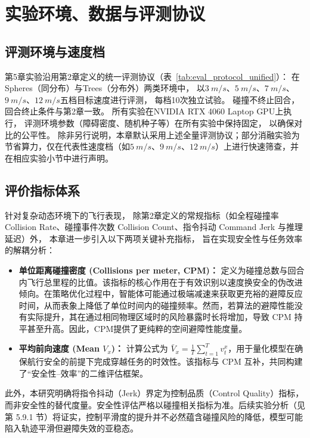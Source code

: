 \section{实验环境、数据与评测协议}

\subsection{评测环境与速度档}

第5章实验沿用第2章定义的统一评测协议（表~\ref{tab:eval_protocol_unified}）：
在Spheres（同分布）与Trees（分布外）两类环境中，
以$\SI{3}{m/s}$、$\SI{5}{m/s}$、$\SI{7}{m/s}$、$\SI{9}{m/s}$、$\SI{12}{m/s}$五档目标速度进行评测，
每档10次独立试验。
碰撞不终止回合，回合终止条件与第2章一致。
所有实验在NVIDIA RTX 4060 Laptop GPU上执行，
评测环境参数（障碍密度、随机种子等）在所有实验中保持固定，
以确保对比的公平性。
除非另行说明，本章默认采用上述全量评测协议；部分消融实验为节省算力，仅在代表性速度档（如$\SI{5}{m/s}$、$\SI{9}{m/s}$、$\SI{12}{m/s}$）上进行快速筛查，并在相应实验小节中进行声明。

\subsection{评价指标体系}

针对复杂动态环境下的飞行表现，
除第2章定义的常规指标（如全程碰撞率 Collision Rate、碰撞事件次数 Collision Count、指令抖动 Command Jerk 与推理延迟）外，
本章进一步引入以下两项关键补充指标，
旨在实现安全性与任务效率的解耦分析：

\begin{itemize}
  \item \textbf{单位距离碰撞密度 (Collisions per meter, CPM)：} 定义为碰撞总数与回合内飞行总里程的比值。该指标的核心作用在于有效识别以速度换安全的伪改进倾向。在策略优化过程中，智能体可能通过极端减速来获取更充裕的避障反应时间，从而表象上降低了单位时间内的碰撞频率。然而，若算法的避障性能没有实际提升，其在通过相同物理区域时的风险暴露时长将增加，导致 CPM 持平甚至升高。因此，CPM提供了更纯粹的空间避障性能度量。

  \item \textbf{平均前向速度 (Mean $V_x$)：} 计算公式为 $\bar{V}_x = \frac{1}{T}\sum_{t=1}^{T} v^x_t$，用于量化模型在确保航行安全的前提下完成穿越任务的时效性。该指标与 CPM 互补，共同构建了“安全性--效率”的二维评估框架。
\end{itemize}

此外，本研究明确将指令抖动（Jerk）界定为控制品质（Control Quality）指标，而非安全性的替代度量。安全性评估严格以碰撞相关指标为准。后续实验分析（见第 5.9.1 节）将证实，控制平滑度的提升并不必然蕴含碰撞风险的降低，模型可能陷入轨迹平滑但避障失效的亚稳态。

